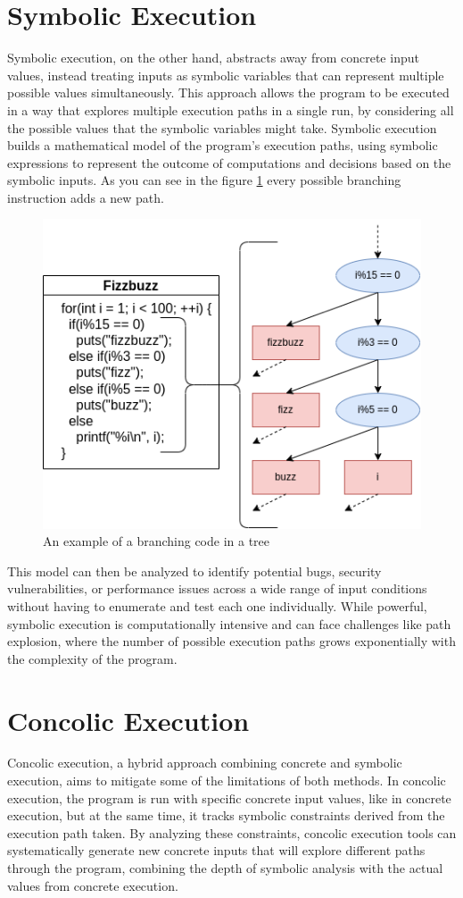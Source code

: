 \section{Symbolic Execution}
Symbolic execution, on the other hand, abstracts away from concrete input values, instead treating inputs as symbolic variables that can represent multiple possible values simultaneously. 
This approach allows the program to be executed in a way that explores multiple execution paths in a single run, by considering all the possible values that the symbolic variables might take. 
Symbolic execution builds a mathematical model of the program's execution paths, using symbolic expressions to represent the outcome of computations and decisions based on the symbolic inputs. 
As you can see in the figure \ref{fig:sym_tree} every possible branching instruction adds a new path.
\begin{figure}[ht]
    \centering
    \includegraphics[width=0.8\linewidth]{figures/sym_trans}
    \caption{An example of a branching code in a tree}
    \label{fig:sym_tree}
\end{figure}

This model can then be analyzed to identify potential bugs, security vulnerabilities, or performance issues across a wide range of input conditions without having to enumerate and test each one individually. 
While powerful, symbolic execution is computationally intensive and can face challenges like path explosion, where the number of possible execution paths grows exponentially with the complexity of the program.



\section{Concolic Execution} 
Concolic execution, a hybrid approach combining concrete and symbolic execution, aims to mitigate some of the limitations of both methods. 
In concolic execution, the program is run with specific concrete input values, like in concrete execution, but at the same time, it tracks symbolic constraints derived from the execution path taken. 
By analyzing these constraints, concolic execution tools can systematically generate new concrete inputs that will explore different paths through the program, combining the depth of symbolic analysis with the actual values from concrete execution.

